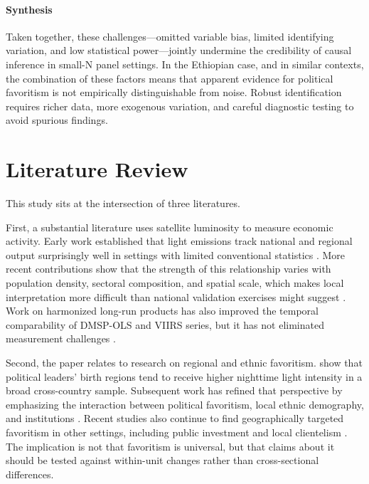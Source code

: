 \documentclass[12pt,a4paper]{article}
\begin{document}
\paragraph{Synthesis}

Taken together, these challenges—omitted variable bias, limited identifying variation, and low statistical power—jointly undermine the credibility of causal inference in small-N panel settings. In the Ethiopian case, and in similar contexts, the combination of these factors means that apparent evidence for political favoritism is not empirically distinguishable from noise. Robust identification requires richer data, more exogenous variation, and careful diagnostic testing to avoid spurious findings.

\section{Literature Review}
This study sits at the intersection of three literatures.

First, a substantial literature uses satellite luminosity to measure economic activity. Early work established that light emissions track national and regional output surprisingly well in settings with limited conventional statistics \citep{Chen2011,Henderson2012}. More recent contributions show that the strength of this relationship varies with population density, sectoral composition, and spatial scale, which makes local interpretation more difficult than national validation exercises might suggest \citep{Bluhm2022,Gibson2021}. Work on harmonized long-run products has also improved the temporal comparability of DMSP-OLS and VIIRS series, but it has not eliminated measurement challenges \citep{Li2023,Gibson2024}.

Second, the paper relates to research on regional and ethnic favoritism. \citet{Hodler2014} show that political leaders' birth regions tend to receive higher nighttime light intensity in a broad cross-country sample. Subsequent work has refined that perspective by emphasizing the interaction between political favoritism, local ethnic demography, and institutions \citep{BeiserMcGrath2021}. Recent studies also continue to find geographically targeted favoritism in other settings, including public investment and local clientelism \citep{Onana2024,Cruzatti2024}. The implication is not that favoritism is universal, but that claims about it should be tested against within-unit changes rather than cross-sectional differences.
\end{document}
